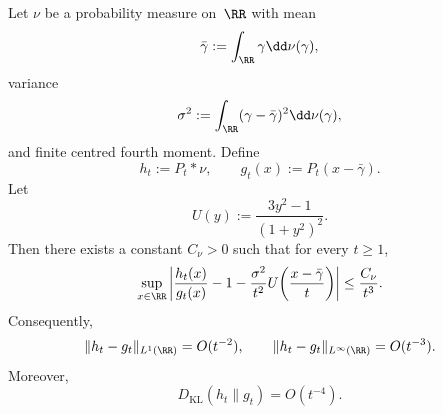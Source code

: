 \begin{proposition}%
\label{thm:poisson-second-order}
Let $\nu$ be a probability measure on~$\RR$ with mean
\[
\bar\gamma:=\int_{\RR}\gamma\dd\nu(\gamma),
\]
variance
\[
\sigma^{2}:=\int_{\RR}(\gamma-\bar\gamma)^{2}\dd\nu(\gamma),
\]
and finite centred fourth moment.  Define
\[
h_t:=P_t*\nu,
\qquad
g_t(x):=P_t(x-\bar\gamma).
\]
Let
\[
U(y):=\frac{3y^{2}-1}{(1+y^{2})^{2}}.
\]
Then there exists a constant $C_\nu>0$ such that for every $t\ge 1$,
\begin{equation}\label{eq:poisson-profile}
\sup_{x\in\RR}\left|
\frac{h_t(x)}{g_t(x)}
-1
-\frac{\sigma^{2}}{t^{2}}U\!\left(\frac{x-\bar\gamma}{t}\right)
\right|
\le \frac{C_\nu}{t^{3}}.
\end{equation}
Consequently,
\begin{equation}\label{eq:poisson-l1-rate}
\|h_t-g_t\|_{L^{1}(\RR)}=O(t^{-2}),
\qquad
\|h_t-g_t\|_{L^\infty(\RR)}=O(t^{-3}).
\end{equation}
Moreover,
\begin{equation}\label{eq:poisson-kl-rate}
D_{\mathrm{KL}}(h_t\|g_t)=O(t^{-4}).
\end{equation}
\end{proposition}

